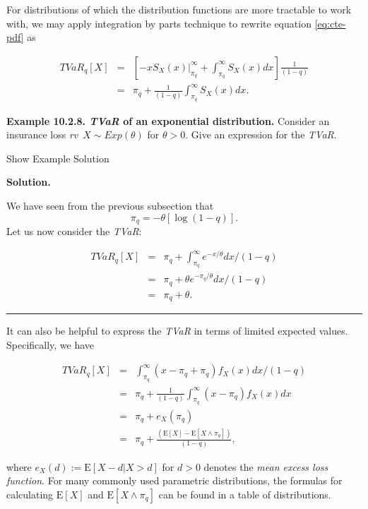 \documentclass[]{book}
\theoremstyle{definition}
\theoremstyle{definition}
\theoremstyle{definition}
\theoremstyle{remark}
\begin{document}
For distributions of which the distribution functions are more tractable
to work with, we may apply integration by parts technique to rewrite
equation \eqref{eq:cte-pdf} as

\begin{eqnarray*}
TVaR_{q}[X]&=&\left[-x S_X(x)\big |_{\pi_q}^{\infty}+\int_{\pi_q}^{\infty}S_X(x)dx\right]\frac{1}{(1-q)}\\
&=& \pi_q +\frac{1}{(1-q)}\int_{\pi_q}^{\infty}S_X(x)dx.
\end{eqnarray*}

\textbf{Example 10.2.8. \emph{TVaR} of an exponential distribution.}
Consider an insurance loss \emph{rv}~\(X\sim Exp(\theta)\) for
\(\theta>0\). Give an expression for the \emph{TVaR}.

Show Example Solution

\hypertarget{toggleExamplePortMgt.2.8}{}
\textbf{Solution.}

We have seen from the previous subsection that \[
\pi_q=-\theta[\log(1-q)].
\] Let us now consider the \emph{TVaR}:

\begin{eqnarray*}
  TVaR_q[X] &=& \pi_q+\int_{\pi_q}^{\infty} e^{-x/\theta}dx/(1-q)\\
&=& \pi_q+\theta e^{-\pi_q/\theta}dx/(1-q)\\
&=& \pi_q+\theta.
\end{eqnarray*}

\begin{center}\rule{0.5\linewidth}{\linethickness}\end{center}

It can also be helpful to express the \emph{TVaR} in terms of limited
expected values. Specifically, we have

\begin{eqnarray}
  TVaR_q[X] &=& \int_{\pi_q}^{\infty} (x-\pi_q+\pi_q)f_X(x)dx/(1-q) \nonumber\\
&=& \pi_q+\frac{1}{(1-q)}\int_{\pi_q}^{\infty} (x-\pi_q)f_X(x)dx\nonumber\\
&=& \pi_q+e_X(\pi_q)\nonumber\\
&=& \pi_q +\frac{\left({\mathrm{E}[X]-\mathrm{E}[X\wedge\pi_q]}\right)}{(1-q)},
\label{eq:cte-expectation}
\end{eqnarray}

where \(e_X(d):=\mathrm{E}[X-d|X>d]\) for \(d>0\) denotes the \emph{mean
excess loss function}. For many commonly used parametric distributions,
the formulas for calculating \(\mathrm{E}[X]\) and
\(\mathrm{E}[X\wedge\pi_q]\) can be found in a table of distributions.
\end{document}
